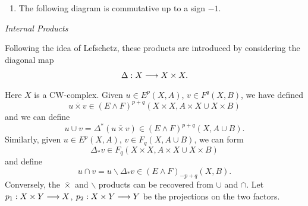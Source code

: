 \documentclass[../main]{subfiles}
\begin{document}
\begin{theorem}
\begin{enumerate}
\item[(iv)] The following diagram is commutative up to a sign $-1$.\\
 {
}
\end{enumerate}
\end{theorem}

\emph{Internal Products} 

Following the idea of Lefschetz, these products are introduced by considering the diagonal map \[\Delta : X \lar{} X \times X.\] Here $X$ is a CW-complex. Given $u \in E^p(X, A)$, $v \in F^q(X, B)$, we have defined \[u \overline \times v \in (E \wedge F)^{p + q}(X \times X, A \times X \cup X \times B)\] and we can define \[u \cup v = \Delta^\ast (u \overline \times v) \in (E \wedge F)^{p + q}(X, A \cup B).\] Similarly, given $u \in E^p(X, A)$, $v \in F_q(X, A \cup B)$, we can form \[\Delta_\ast v \in F_q(X \times X, A \times X \cup X \times B)\] and define \[u \cap v = u \backslash \Delta_\ast v \in (E \wedge F)_{-p + q} (X, B).\] Conversely, the $\overline \times$ and $\backslash$ products can be recovered from $\cup$ and $\cap$. Let $p_1 : X \times Y \lar{} X$, $p_2 : X \times Y \lar{} Y$ be the projections on the two factors.
\end{document}
